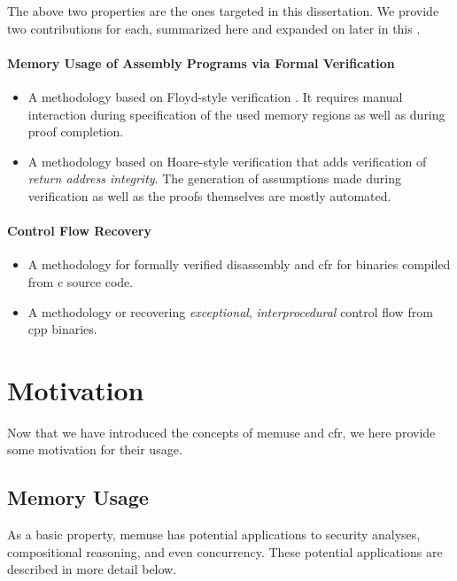 The above two properties are the ones targeted in this dissertation.
We provide two contributions for each, summarized here and expanded on later in this .
\paragraph{Memory Usage of Assembly Programs via Formal Verification}
\begin{itemize}
  \item A methodology based on Floyd-style verification \autocite{floyd1967assigning}.
  It requires manual interaction during specification of the used memory regions as well as during proof completion.
  \item A methodology based on Hoare-style verification \autocite{hoare1969axiomatic} that adds verification of \emph{return address integrity}.
  The generation of assumptions made during verification as well as the proofs themselves are mostly automated.
\end{itemize}

\paragraph{Control Flow Recovery}
\begin{itemize}
  \item A methodology for formally verified disassembly and \gls{cfr} for binaries compiled from \gls{c} source code.
  \item A methodology or recovering \emph{exceptional}, \emph{interprocedural} control flow from \gls{cpp} binaries.
\end{itemize}

\section{Motivation}
Now that we have introduced the concepts of \gls{memuse} and \gls{cfr}, we here provide some motivation for their usage.

\subsection{Memory Usage}
As a basic property, \gls{memuse} has potential applications to security analyses, compositional reasoning, and even concurrency.
These potential applications are described in more detail below.

